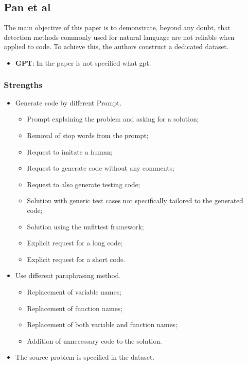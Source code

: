 \subsection{Pan et al}
\label{section:Pan et al}
The main objective of this paper is to demonstrate, 
beyond any doubt, that detection methods commonly used for 
natural language are not reliable when applied to code. 
To achieve this, the authors construct a dedicated dataset.


\begin{itemize}
    \item \textbf{GPT}: In the paper is not specified what gpt.
\end{itemize}


\subsubsection*{Strengths}
\begin{itemize}
    \item Generate code by different Prompt.
    \begin{itemize}
        \item Prompt explaining the problem and asking for a solution;
        \item Removal of stop words from the prompt;
        \item Request to imitate a human;
        \item Request to generate code without any comments;
        \item Request to also generate testing code;
        \item Solution with generic test cases not specifically tailored to the generated code;
        \item Solution using the unfittest framework;
        \item Explicit request for a long code;
        \item Explicit request for a short code.
    \end{itemize}
    \item Use different paraphrasing method.
    \begin{itemize}
        \item Replacement of variable names;
        \item Replacement of function names;
        \item Replacement of both variable and function names;
        \item Addition of unnecessary code to the solution.
    \end{itemize}
    \item The source problem is specified in the dataset.
\end{itemize}


